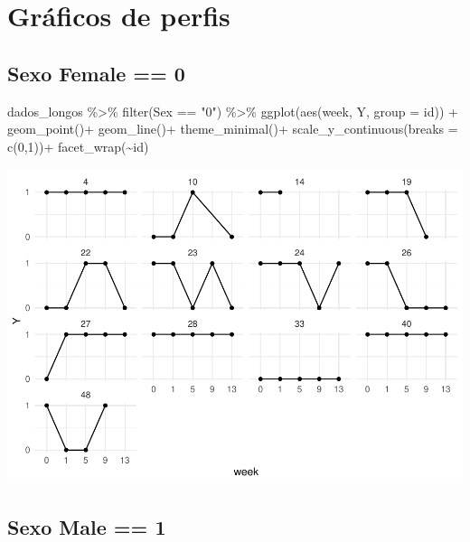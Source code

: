 \documentclass[
]{article}
\newenvironment{Shaded}{\begin{snugshade}}{\end{snugshade}}
\newcommand{\AttributeTok}[1]{\textcolor[rgb]{0.80,0.80,0.80}{#1}}
\newcommand{\DecValTok}[1]{\textcolor[rgb]{0.86,0.86,0.80}{#1}}
\newcommand{\FunctionTok}[1]{\textcolor[rgb]{0.94,0.94,0.56}{#1}}
\newcommand{\NormalTok}[1]{\textcolor[rgb]{0.80,0.80,0.80}{#1}}
\newcommand{\SpecialCharTok}[1]{\textcolor[rgb]{0.86,0.64,0.64}{#1}}
\newcommand{\StringTok}[1]{\textcolor[rgb]{0.80,0.58,0.58}{#1}}
\begin{document}
\hypertarget{gruxe1ficos-de-perfis}{%
\section{Gráficos de perfis}\label{gruxe1ficos-de-perfis}}

\hypertarget{sexo-female-0}{%
\subsection{Sexo Female == 0}\label{sexo-female-0}}

\begin{Shaded}
\begin{Highlighting}[]
\NormalTok{dados\_longos }\SpecialCharTok{\%\textgreater{}\%} \FunctionTok{filter}\NormalTok{(Sex }\SpecialCharTok{==} \StringTok{"0"}\NormalTok{) }\SpecialCharTok{\%\textgreater{}\%}
  \FunctionTok{ggplot}\NormalTok{(}\FunctionTok{aes}\NormalTok{(week, Y, }\AttributeTok{group =}\NormalTok{ id)) }\SpecialCharTok{+}
  \FunctionTok{geom\_point}\NormalTok{()}\SpecialCharTok{+}
  \FunctionTok{geom\_line}\NormalTok{()}\SpecialCharTok{+}
  \FunctionTok{theme\_minimal}\NormalTok{()}\SpecialCharTok{+}
  \FunctionTok{scale\_y\_continuous}\NormalTok{(}\AttributeTok{breaks =} \FunctionTok{c}\NormalTok{(}\DecValTok{0}\NormalTok{,}\DecValTok{1}\NormalTok{))}\SpecialCharTok{+}
  \FunctionTok{facet\_wrap}\NormalTok{(}\SpecialCharTok{\textasciitilde{}}\NormalTok{id)}
\end{Highlighting}
\end{Shaded}

\includegraphics{EDA__files/figure-latex/unnamed-chunk-7-1.pdf}

\hypertarget{sexo-male-1}{%
\subsection{Sexo Male == 1}\label{sexo-male-1}}
\end{document}
